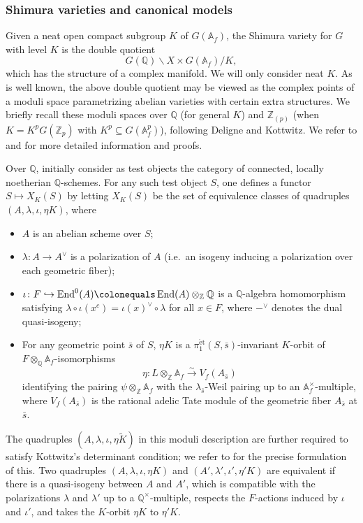 \documentclass{amsart}
\theoremstyle{remark}
\numberwithin{equation}{subsection}
\newcommand{\A}{\AA}
\newcommand{\Q}{\QQ}
\newcommand{\Z}{\ZZ}
\renewcommand{\AA}{{\mathbb A}}
\newcommand{\QQ}{{\mathbb Q}}
\newcommand{\ZZ}{{\mathbb Z}}
\newcommand{\Zp}{\Z_p}
\DeclareMathOperator{\End}{End}
\newcommand{\et}{\mathrm{\acute{e}t}}
\newcommand{\sub}{\subseteq}
\newcommand{\defeq}{\colonequals}
\newcommand{\tensor}{\otimes}
\renewcommand{\(}{\left(}
\renewcommand{\)}{\right)}
\begin{document}
\subsubsection{Shimura varieties and canonical models}
Given a neat open compact subgroup $K$ of $G(\AA_f)$, the Shimura variety for $G$ with level $K$ is the double quotient 
\[
G(\QQ) \backslash X \times G(\AA_f) / K,
\]
which has the structure of a complex manifold. We will only consider neat $K$. As is well known, the above double quotient may be viewed as the complex points of a moduli space parametrizing abelian varieties with certain extra structures. We briefly recall these moduli spaces over $\Q$ (for general $K$) and $\Z_{(p)}$ (when $K=K^p G(\Zp)$ with $K^p \sub G(\A_f^p)$), following Deligne and Kottwitz. We refer to \cite[\S 5]{kottwitz-shimura} and \cite[\S 1-2]{lan-thesis} for more detailed information and proofs.

\medskip

Over $\Q$, initially consider as test objects the category of connected, locally noetherian $\QQ$-schemes. For any such test object $S$, one defines a functor $S \mapsto X_K(S)$ by letting $X_K(S)$ be the set of equivalence classes of quadruples $(A,\lambda, \iota, \eta K)$, where
\begin{itemize}
 \item $A$ is an abelian scheme over $S$;
 \item $\lambda\colon A \rightarrow A^\vee$ is a polarization of $A$ (i.e.\ an isogeny inducing a polarization over each geometric fiber);
 \item $\iota\colon F \hookrightarrow \End^0(A) \defeq \End(A)\tensor_\ZZ \QQ$
       is a $\Q$-algebra homomorphism satisfying $\lambda \circ \iota(x^c)=\iota(x)^\vee \circ \lambda$ for all $x\in F$, where $-^\vee$ denotes the dual quasi-isogeny;
 \item For any geometric point $\bar s$ of $S$, $\eta K$ is a $\pi_1^{\et}(S,\bar s)$-invariant $K$-orbit of $F \tensor_\QQ \AA_f$-isomorphisms
       \[
	\eta\colon L \tensor_\Z \AA_f \stackrel{\sim}{\rightarrow} V_f(A_{\bar{s}})
       \]
       identifying the pairing $\psi \tensor_\Z \AA_f$ with the $\lambda_{\bar{s}}$-Weil pairing up to an $\AA_f^\times$-multiple, 
       where $V_f(A_{\bar{s}})$ is the rational adelic Tate module of the geometric fiber $A_{\bar{s}}$ at $\bar s$. 
 \end{itemize} 
 
The quadruples $(A, \lambda, \iota, \eta \widetilde{K})$ in 
this moduli description are further required to satisfy Kottwitz's determinant condition; we refer to \cite[\S 5]{kottwitz-shimura} for the precise formulation of this.
Two quadruples $(A, \lambda, \iota, \eta K)$ and $(A', \lambda', \iota', \eta' K)$ are equivalent if there is a 
quasi-isogeny between $A$ and $A'$, which is compatible with the 
polarizations $\lambda$ and $\lambda'$ up to a $\QQ^\times$-multiple, respects the $F$-actions induced by $\iota$ 
and $\iota'$, and takes the $K$-orbit $\eta K$ to $\eta' K$.
\end{document}
